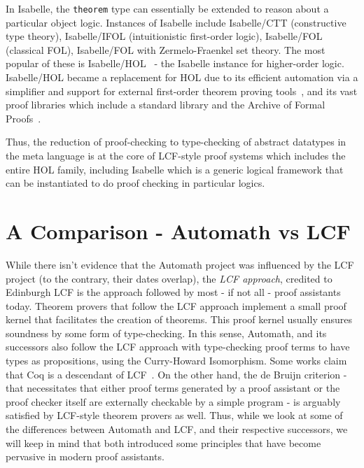 \documentclass{article}
\begin{document}
	In Isabelle, the \texttt{theorem}
	type can essentially be extended to 
	reason about a particular object logic. 
	Instances of Isabelle include 
	Isabelle/CTT (constructive type theory),
	Isabelle/IFOL (intuitionistic first-order 
	logic), Isabelle/FOL (classical FOL), 
	Isabelle/FOL with Zermelo-Fraenkel 
	set theory. The most popular of these
	is Isabelle/HOL~\cite{10.5555/1791547} 
	- the Isabelle
	instance for higher-order logic.
	Isabelle/HOL became a replacement for 
	HOL due to its efficient automation 
	via a simplifier and support for 
	external first-order theorem proving 
	tools~\cite
	{10.1007/978-3-540-25984-8_28}, and 
	its vast proof libraries which include 
	a standard library and the 
	Archive of Formal Proofs~\cite{afp}. 
	
	Thus, the reduction of proof-checking
	to type-checking of abstract datatypes
	in the meta language is at the core 
	of LCF-style proof systems which 
	includes the entire HOL family, 
	including Isabelle which is a 
	generic logical framework that 
	can be instantiated to do proof
	checking in particular logics.
	

\section{A Comparison - Automath vs LCF}
  	While there isn't evidence that the 
  	Automath project was influenced by 
  	the LCF project (to the contrary, 
  	their dates overlap), the 
  	\textit{LCF approach}, credited 
  	to Edinburgh LCF is the approach
  	followed by most - if not all - 
  	proof assistants today. 
  	Theorem provers that follow the 
  	LCF approach implement a small 
  	proof kernel that facilitates 
  	the creation of theorems. This 
  	proof kernel usually ensures 
  	soundness by some form of 
  	type-checking. In this sense, 
  	Automath, and its successors also 
  	follow the LCF approach with 
  	type-checking proof terms to have 
  	types as propositions, using the 
  	Curry-Howard Isomorphism. Some works 
  	claim that Coq is a descendant of 
  	LCF~\cite
  	{DBLP:journals/corr/abs-1907-02836}. 
  	On the other hand, the de Bruijn 
  	criterion - that necessitates 
  	that either proof terms generated 
  	by a proof assistant or the proof 
  	checker itself are externally 
  	checkable by a simple program - 
  	is arguably satisfied by LCF-style
  	theorem provers as well. Thus, 
  	while we look at some of the 
  	differences between Automath and 
  	LCF, and their respective successors, 
  	we will keep in mind that both 
  	introduced some principles that 
  	have become pervasive in modern 
  	proof assistants.
  	
\end{document}
